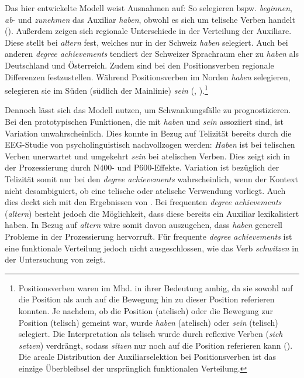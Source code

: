 Das hier entwickelte Modell weist Ausnahmen auf: So selegieren bspw. \textit{beginnen}, \textit{ab}- und \textit{zunehmen} das Auxiliar \textit{haben}, obwohl es sich um telische Verben handelt (\cite[111]{Gillmann.2016}). Außerdem zeigen sich regionale Unterschiede in der Verteilung der Auxiliare. Diese stellt \textcite[262--264]{Gillmann.2016} bei \textit{altern} fest, welches nur in der Schweiz \textit{haben} selegiert. Auch bei anderen \textit{degree achievements} tendiert der Schweizer Sprachraum eher zu \textit{haben} als Deutschland und Österreich. Zudem sind bei den Positionsverben regionale Differenzen festzustellen. Während Positionsverben im Norden \textit{haben} selegieren, selegieren sie im Süden (südlich der Mainlinie) \textit{sein} (\cite[211--212]{Gillmann.2011}, \cite[908]{Duden.2016}).\footnote{Positionsverben waren im Mhd. in ihrer Bedeutung ambig, da sie sowohl auf die Position als auch auf die Bewegung hin zu dieser Position referieren konnten. Je nachdem, ob die Position (atelisch) oder die Bewegung zur Position (telisch) gemeint war, wurde \textit{haben} (atelisch) oder \textit{sein} (telisch) selegiert.  Die Interpretation als telisch wurde durch reflexive Verben (\textit{sich setzen}) verdrängt, sodass \textit{sitzen} nur noch auf die Position referieren kann (\cite[211--212]{Gillmann.2011}). Die areale Distribution der Auxiliarselektion bei Positionsverben ist das einzige Überbleibsel der ursprünglich funktionalen Verteilung.} 

 

Dennoch lässt sich das Modell nutzen, um Schwankungsfälle zu prognostizieren. Bei den prototypischen Funktionen, die mit \textit{haben} und \textit{sein} assoziiert sind, ist Variation unwahrscheinlich. Dies konnte in Bezug auf Telizität bereits durch die EEG-Studie von \textcite{Roehm.2013} psycholinguistisch nachvollzogen werden: \textit{Haben} ist bei telischen Verben unerwartet und umgekehrt \textit{sein} bei atelischen Verben. Dies zeigt sich in der Prozessierung durch N400- und P600-Effekte. Variation ist bezüglich der Telizität somit nur bei den \textit{degree achievements} wahrscheinlich, wenn der Kontext nicht desambiguiert, ob eine telische oder atelische Verwendung vorliegt. Auch dies deckt sich mit den Ergebnissen von \textcite{Roehm.2013}. Bei frequenten \textit{degree achievements} (\textit{altern}) besteht jedoch die Möglichkeit, dass diese bereits ein Auxiliar lexikalisiert haben. In Bezug auf \textit{altern} wäre somit davon auszugehen, dass \textit{haben} generell Probleme in der Prozessierung hervorruft. Für frequente \textit{degree achievements} ist eine funktionale Verteilung jedoch nicht ausgeschlossen, wie das Verb \textit{schwitzen} in der Untersuchung von \textcite[256--257]{Gillmann.2016} zeigt. 



